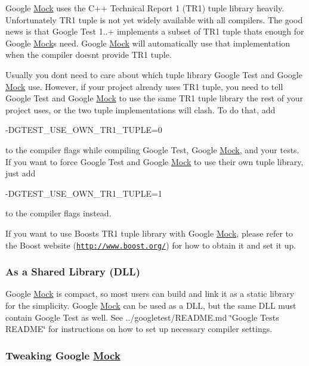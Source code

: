 Google \hyperlink{classMock}{Mock} uses the C++ Technical Report 1 (T\+R1) tuple library heavily. Unfortunately T\+R1 tuple is not yet widely available with all compilers. The good news is that Google Test 1..+ implements a subset of T\+R1 tuple that\textquotesingle{}s enough for Google \hyperlink{classMock}{Mock}\textquotesingle{}s need. Google \hyperlink{classMock}{Mock} will automatically use that implementation when the compiler doesn\textquotesingle{}t provide T\+R1 tuple.

Usually you don\textquotesingle{}t need to care about which tuple library Google Test and Google \hyperlink{classMock}{Mock} use. However, if your project already uses T\+R1 tuple, you need to tell Google Test and Google \hyperlink{classMock}{Mock} to use the same T\+R1 tuple library the rest of your project uses, or the two tuple implementations will clash. To do that, add \begin{DoxyVerb}-DGTEST_USE_OWN_TR1_TUPLE=0
\end{DoxyVerb}


to the compiler flags while compiling Google Test, Google \hyperlink{classMock}{Mock}, and your tests. If you want to force Google Test and Google \hyperlink{classMock}{Mock} to use their own tuple library, just add \begin{DoxyVerb}-DGTEST_USE_OWN_TR1_TUPLE=1
\end{DoxyVerb}


to the compiler flags instead.

If you want to use Boost\textquotesingle{}s T\+R1 tuple library with Google \hyperlink{classMock}{Mock}, please refer to the Boost website (\href{http://www.boost.org/}{\tt http\+://www.\+boost.\+org/}) for how to obtain it and set it up.

\subsubsection*{As a Shared Library (D\+LL)}

Google \hyperlink{classMock}{Mock} is compact, so most users can build and link it as a static library for the simplicity. Google \hyperlink{classMock}{Mock} can be used as a D\+LL, but the same D\+LL must contain Google Test as well. See ../googletest/\+R\+E\+A\+D\+ME.md \char`\"{}\+Google Test\textquotesingle{}s R\+E\+A\+D\+M\+E\char`\"{} for instructions on how to set up necessary compiler settings.

\subsubsection*{Tweaking Google \hyperlink{classMock}{Mock}}

